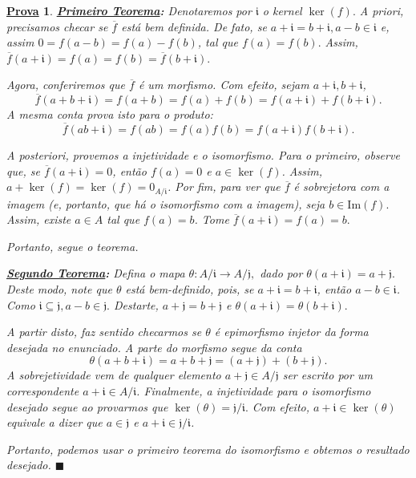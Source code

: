 \documentclass{article}
\newtheorem*{proof*}{\underline{Prova}}
\renewcommand\qedsymbol{$\blacksquare$}
\begin{document}
    \begin{proof*}
      \textbf{\underline{Primeiro Teorema}:} Denotaremos por \(\mathfrak{i}\) o kernel \(\ker{(f)}.\)
      A priori, precisamos checar se \(\overline{f}\) está bem definida. De fato, se \(a+\mathfrak{i}=b+\mathfrak{i}, a-b\in \mathfrak{i}\) e, assim
      \(0 = f(a-b) = f(a)-f(b)\), tal que \(f(a) = f(b).\) Assim, \(\overline{f}(a+\mathfrak{i}) = f(a) = f(b) = \overline{f}(b+\mathfrak{i}).\)

      Agora, conferiremos que \(\overline{f}\) é um morfismo. Com efeito, sejam \(a+\mathfrak{i}, b+\mathfrak{i}\),
      \[
        \overline{f}(a+b+\mathfrak{i}) = f(a+b) = f(a)+f(b) = f(a+\mathfrak{i})+f(b+\mathfrak{i}).
      \]
      A mesma conta prova isto para o produto:
      \[
        \overline{f}(ab+\mathfrak{i}) = f(ab) = f(a)f(b) = f(a+\mathfrak{i})f(b+\mathfrak{i}).
      \]

      A posteriori, provemos a injetividade e o isomorfismo. Para o primeiro, observe que, se \(\overline{f}(a+\mathfrak{i}) = 0\), então
      \(f(a) = 0\) e \(a\in\ker{(f)}\). Assim, \(a+\ker{(f)} = \ker{(f)} = 0_{A/\mathfrak{i}}\). Por fim,
      para ver que \(\overline{f}\) é sobrejetora com a imagem (e, portanto, que há o isomorfismo com a imagem),
      seja \(b\in \mathrm{Im}(f).\) Assim, existe \(a\in A\) tal que \(f(a) = b\). Tome \(\overline{f}(a+\mathfrak{i}) = f(a)=b.\)

      Portanto, segue o teorema.

      \textbf{\underline{Segundo Teorema}:} Defina o mapa \(\theta :A/\mathfrak{i}\rightarrow A/\mathfrak{j},\) dado por \(\theta(a+\mathfrak{i}) = a + \mathfrak{j}.\)
      Deste modo, note que \(\theta \) está bem-definido, pois, se \(a+\mathfrak{i} = b+\mathfrak{i}\), então \(a-b\in \mathfrak{i}\). Como
      \(\mathfrak{i}\subseteq \mathfrak{j}, a-b\in \mathfrak{j}.\) Destarte, \(a+\mathfrak{j} = b+\mathfrak{j}\) e \(\theta(a+\mathfrak{i}) = \theta (b+\mathfrak{i}).\)

      A partir disto, faz sentido checarmos se \(\theta \) é epimorfismo injetor da forma desejada no enunciado. A parte do morfismo segue da conta 
      \[
        \theta (a+b+\mathfrak{i}) = a + b + \mathfrak{j} = (a+\mathfrak{j}) + (b+\mathfrak{j}).
      \]
      A sobrejetividade vem de qualquer elemento \(a+\mathfrak{j}\in A/\mathfrak{j}\) ser escrito por um correspondente \(a+\mathfrak{i}\in A/\mathfrak{i}\).
      Finalmente, a injetividade para o isomorfismo desejado segue ao provarmos que \(\ker{(\theta )}=\mathfrak{j}/\mathfrak{i}.\) Com efeito,
      \(a+\mathfrak{i}\in\ker{(\theta )}\) equivale a dizer que \(a\in \mathfrak{j}\) e \(a+\mathfrak{i}\in \mathfrak{j}/\mathfrak{i}\).

      Portanto, podemos usar o primeiro teorema do isomorfismo e obtemos o resultado desejado. \qedsymbol
    \end{proof*}
\end{document}
